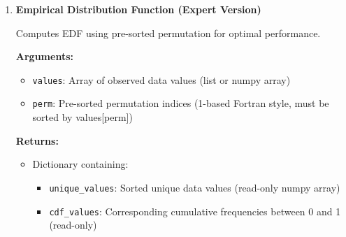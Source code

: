 \documentclass[11pt]{article}
\begin{document}
\begin{enumerate}
\begin{enumerate}
\begin{itemize}
\begin{itemize}
	      	      	      	\item \texttt{cdf\_values}: Corresponding cumulative frequencies
	      	      	      	      between 0 and 1 (read-only)
	      	      	      	      
	      	      	      	\item \texttt{n\_unique}: Number of unique values found (int)
	      	      	      \end{itemize}
	      	      \end{itemize}
	      	      \begin{lstlisting}[language=Python, caption={Empirical Distribution Function Computation}]
result = compute_edf(values)

# Access results
unique_vals = result['unique_values']  
# Sorted unique values

cdf_vals = result['cdf_values']        
# Cumulative distribution values  

n_unique = result['n_unique']          
# Number of unique values
	      	      \end{lstlisting}
	      	      
	      	\item \textbf{Empirical Distribution Function (Expert Version)}
	      	      
	      	      Computes EDF using pre-sorted permutation for optimal performance.
	      	      
	      	      \textbf{Arguments:}
	      	      \begin{itemize}
	      	      	\item \texttt{values}: Array of observed data values (list or numpy
	      	      	      array)
	      	      	      
	      	      	\item \texttt{perm}: Pre-sorted permutation indices (1-based Fortran
	      	      	      style, must be sorted by values[perm])
	      	      \end{itemize}
	      	      \textbf{Returns:}
	      	      \begin{itemize}
	      	      	\item Dictionary containing:
	      	      	      \begin{itemize}
	      	      	      	\item \texttt{unique\_values}: Sorted unique data values (read-only
	      	      	      	      numpy array)
	      	      	      	      
	      	      	      	\item \texttt{cdf\_values}: Corresponding cumulative frequencies
	      	      	      	      between 0 and 1 (read-only)
	      	      	      	      

\end{itemize}
\end{itemize}
\end{enumerate}
\end{enumerate}
\end{document}

